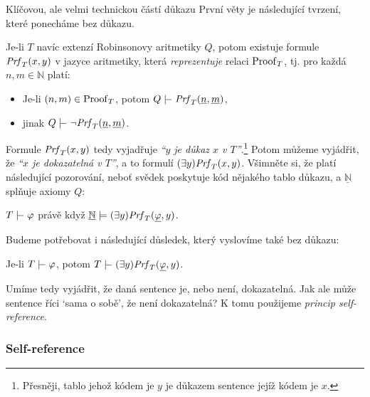 Klíčovou, ale velmi technickou částí důkazu První věty je následující tvrzení, které ponecháme bez důkazu.

\begin{proposition}
Je-li $T$ navíc extenzí Robinsonovy aritmetiky $Q$, potom existuje formule $\mathit{Prf}_T(x,y)$ v jazyce aritmetiky, která \emph{reprezentuje} relaci $\operatorname{Proof}_T$, tj. pro každá $n,m\in\mathbb N$ platí:
\begin{itemize}
    \item Je-li $(n,m)\in\operatorname{Proof}_T$, potom $Q\proves\Prf_T(\underline{n},\underline{m})$,
    \item jinak $Q\proves\neg\Prf_T(\underline{n},\underline{m})$.
\end{itemize} 
\end{proposition}

Formule $\mathit{Prf}_T(x,y)$ tedy vyjadřuje \emph{``$y$ je důkaz $x$ v $T$''}.\footnote{Přesněji, tablo jehož kódem je $y$ je důkazem sentence jejíž kódem je $x$.} Potom můžeme vyjádřit, že \emph{``$x$ je dokazatelná v $T$''}, a to formulí $(\exists y)\mathit{Prf}_T(x,y)$. Všimněte si, že platí následující pozorování, neboť svědek poskytuje kód nějakého tablo důkazu, a $\underline{\mathbb N}$ splňuje axiomy $Q$:
\begin{observation}\label{observation:proof-predicate}
$T\proves\varphi$ právě když $\underline{\mathbb N}\models (\exists y)\mathit{Prf}_T(\underline{\varphi},y)$.  
\end{observation}
Budeme potřebovat i následující důsledek, který vyslovíme také bez důkazu:
\begin{corollary}\label{corollary:predicate-of-provability}
    Je-li $T\proves\varphi$, potom $T\proves (\exists y)\Prf_T(\underline{\varphi},y)$.
\end{corollary}

Umíme tedy vyjádřit, že daná sentence je, nebo není, dokazatelná. Jak ale může sentence říci `sama o sobě', že není dokazatelná? K tomu použijeme \emph{princip self-reference}.

\subsubsection*{Self-reference}

